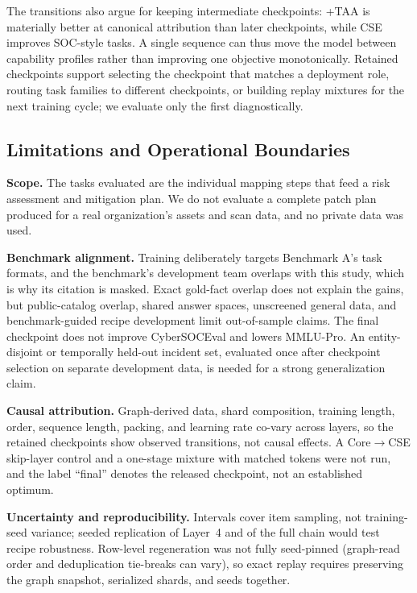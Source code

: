 \documentclass[conference]{IEEEtran}
\begin{document}
The transitions also argue for keeping intermediate checkpoints: +TAA is materially better at canonical attribution than later checkpoints, while CSE improves SOC-style tasks. A single sequence can thus move the model between capability profiles rather than improving one objective monotonically. Retained checkpoints support selecting the checkpoint that matches a deployment role, routing task families to different checkpoints, or building replay mixtures for the next training cycle; we evaluate only the first diagnostically.

\subsection{Limitations and Operational Boundaries}\label{sec:limits}
\textbf{Scope.} The tasks evaluated are the individual mapping steps that feed a risk assessment and mitigation plan. We do not evaluate a complete patch plan produced for a real organization's assets and scan data, and no private data was used.

\textbf{Benchmark alignment.} Training deliberately targets Benchmark A's task formats, and the benchmark's development team overlaps with this study, which is why its citation is masked. Exact gold-fact overlap does not explain the gains, but public-catalog overlap, shared answer spaces, unscreened general data, and benchmark-guided recipe development limit out-of-sample claims. The final checkpoint does not improve CyberSOCEval and lowers MMLU-Pro. An entity-disjoint or temporally held-out incident set, evaluated once after checkpoint selection on separate development data, is needed for a strong generalization claim.

\textbf{Causal attribution.} Graph-derived data, shard composition, training length, order, sequence length, packing, and learning rate co-vary across layers, so the retained checkpoints show observed transitions, not causal effects. A Core$\rightarrow$CSE skip-layer control and a one-stage mixture with matched tokens were not run, and the label ``final'' denotes the released checkpoint, not an established optimum.

\textbf{Uncertainty and reproducibility.} Intervals cover item sampling, not training-seed variance; seeded replication of Layer~4 and of the full chain would test recipe robustness. Row-level regeneration was not fully seed-pinned (graph-read order and deduplication tie-breaks can vary), so exact replay requires preserving the graph snapshot, serialized shards, and seeds together.
\end{document}
